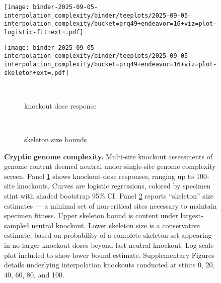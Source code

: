 \begin{figure}

\begin{minipage}{\linewidth}
\centering
\begin{minipage}{0.4\linewidth}
\texttt{[image: binder-2025-09-05-interpolation\_complexity/binder/teeplots/2025-09-05-interpolation\_complexity/bucket=prq49+endeavor=16+viz=plot-logistic-fit+ext=.pdf]}
\end{minipage}%
\begin{minipage}{0.6\linewidth}
\texttt{[image: binder-2025-09-05-interpolation\_complexity/binder/teeplots/2025-09-05-interpolation\_complexity/bucket=prq49+endeavor=16+viz=plot-skeleton+ext=.pdf]}
\end{minipage}
\end{minipage}

\vspace{-1ex}\textsc{}

\begin{minipage}{\linewidth}
\centering
\begin{subfigure}[t]{0.05\linewidth}
~
\end{subfigure}%
\begin{subfigure}[t]{0.4\linewidth}
\centering
\caption{\footnotesize knockout dose response}
\label{fig:cryptic:logistic}
\end{subfigure}%
\begin{subfigure}[t]{0.05\linewidth}
~
\end{subfigure}%
\begin{subfigure}[t]{0.5\linewidth}
\centering
\caption{\footnotesize skeleton size bounds}
\label{fig:cryptic:skeleton}
\end{subfigure}
\end{minipage}

\caption{
\textbf{Cryptic genome complexity.}
\footnotesize
Multi-site knockout assessments of genome content deemed neutral under single-site genome complexity screen.
Panel \ref{fig:cryptic:logistic} shows knockout dose responses, ranging up to 100-site knockouts.
Curves are logistic regressions, colored by specimen stint with shaded bootstrap 95\% CI.
Panel \ref{fig:cryptic:skeleton} reports ``skeleton'' size estimates --- a minimal set of non-critical sites necessary to maintain specimen fitness.
Upper skeleton bound is content under largest-sampled neutral knockout.
Lower skeleton size is a conservative estimate, based on probability of a complete skeleton set appearing in no larger knockout doses beyond last neutral knockout.
Log-scale plot included to show lower bound estimate.
Supplementary Figures  details underlying interpolation knockouts conducted at stints 0, 20, 40, 60, 80, and 100.
}
\label{fig:cryptic}

\end{figure}
